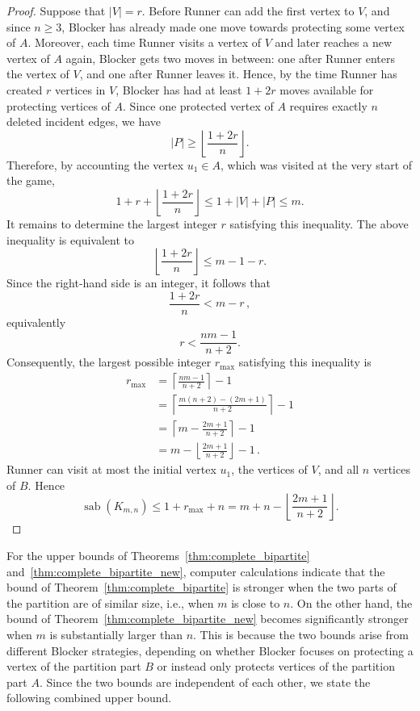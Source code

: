 \documentclass[10pt,a4paper]{amsart}
\DeclareMathOperator{\sab}{\mathrm{sab}}
\begin{document}
\begin{proof}
Suppose that $|V|=r$. Before Runner can add the first vertex to $V$, and since $n \ge 3$, Blocker has already made one move towards protecting some vertex of $A$. Moreover, each time
Runner visits a vertex of $V$ and later reaches a new vertex of $A$ again, Blocker gets two moves in between: one after Runner enters the vertex of $V$, and one after Runner leaves it. Hence, by the time Runner has created $r$ vertices in $V$, Blocker has had at least
$1+2r$ moves available for protecting vertices of $A$. Since one protected vertex of $A$ requires exactly $n$ deleted incident edges, we have
$$
|P|\ge \left\lfloor\frac{1+2r}{n}\right\rfloor .
$$
Therefore, by accounting the vertex $u_1 \in A$, which was visited at the very start of the game,
$$
1+r+\left\lfloor\frac{1+2r}{n}\right\rfloor \le 1 + |V| + |P| \le m.$$
It remains to determine the largest integer $r$ satisfying this inequality. The above inequality is equivalent to
$$\left\lfloor\frac{1+2r}{n}\right\rfloor \le m-1-r.$$
Since the right-hand side is an integer, it follows that
$$\frac{1+2r}{n}<m-r\,,$$
equivalently
$$r<\frac{nm-1}{n+2}.$$
Consequently, the largest possible integer $r_{\max}$ satisfying this inequality is
\begin{align*}
r_{\max} &=\left\lceil\frac{nm-1}{n+2}\right\rceil-1\\
        &=\left\lceil\frac{m(n+2)-(2m+1)}{n+2}\right\rceil-1\\
		&=\left\lceil m-\frac{2m+1}{n+2}\right\rceil -1\\
        &=m-\left\lfloor\frac{2m+1}{n+2}\right\rfloor-1\,.
\end{align*}
Runner can visit at most the initial vertex $u_1$, the vertices of $V$, and all $n$ vertices of $B$. Hence
$$\sab(K_{m,n}) \le 1+r_{\max}+n = m+n-\left\lfloor\frac{2m+1}{n+2}\right\rfloor.$$   
\end{proof}


For the upper bounds of Theorems~\ref{thm:complete_bipartite}
and~\ref{thm:complete_bipartite_new}, computer calculations indicate that the bound of Theorem~\ref{thm:complete_bipartite} is stronger when the two parts of the partition are of similar size, i.e., when $m$ is close to $n$. On the other hand, the bound of
Theorem~\ref{thm:complete_bipartite_new} becomes significantly stronger when $m$ is substantially larger than $n$. This is because the two bounds arise from different Blocker strategies, depending on whether Blocker focuses on protecting a vertex of the partition part $B$ or instead only protects vertices of the partition part $A$. Since the two bounds are independent of each other, we state the following combined upper bound.
\end{document}
